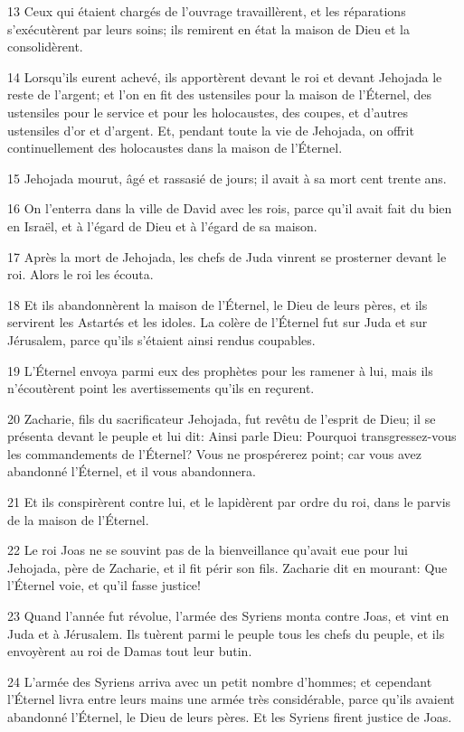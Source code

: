 \par 13 Ceux qui étaient chargés de l'ouvrage travaillèrent, et les réparations s'exécutèrent par leurs soins; ils remirent en état la maison de Dieu et la consolidèrent.
\par 14 Lorsqu'ils eurent achevé, ils apportèrent devant le roi et devant Jehojada le reste de l'argent; et l'on en fit des ustensiles pour la maison de l'Éternel, des ustensiles pour le service et pour les holocaustes, des coupes, et d'autres ustensiles d'or et d'argent. Et, pendant toute la vie de Jehojada, on offrit continuellement des holocaustes dans la maison de l'Éternel.
\par 15 Jehojada mourut, âgé et rassasié de jours; il avait à sa mort cent trente ans.
\par 16 On l'enterra dans la ville de David avec les rois, parce qu'il avait fait du bien en Israël, et à l'égard de Dieu et à l'égard de sa maison.
\par 17 Après la mort de Jehojada, les chefs de Juda vinrent se prosterner devant le roi. Alors le roi les écouta.
\par 18 Et ils abandonnèrent la maison de l'Éternel, le Dieu de leurs pères, et ils servirent les Astartés et les idoles. La colère de l'Éternel fut sur Juda et sur Jérusalem, parce qu'ils s'étaient ainsi rendus coupables.
\par 19 L'Éternel envoya parmi eux des prophètes pour les ramener à lui, mais ils n'écoutèrent point les avertissements qu'ils en reçurent.
\par 20 Zacharie, fils du sacrificateur Jehojada, fut revêtu de l'esprit de Dieu; il se présenta devant le peuple et lui dit: Ainsi parle Dieu: Pourquoi transgressez-vous les commandements de l'Éternel? Vous ne prospérerez point; car vous avez abandonné l'Éternel, et il vous abandonnera.
\par 21 Et ils conspirèrent contre lui, et le lapidèrent par ordre du roi, dans le parvis de la maison de l'Éternel.
\par 22 Le roi Joas ne se souvint pas de la bienveillance qu'avait eue pour lui Jehojada, père de Zacharie, et il fit périr son fils. Zacharie dit en mourant: Que l'Éternel voie, et qu'il fasse justice!
\par 23 Quand l'année fut révolue, l'armée des Syriens monta contre Joas, et vint en Juda et à Jérusalem. Ils tuèrent parmi le peuple tous les chefs du peuple, et ils envoyèrent au roi de Damas tout leur butin.
\par 24 L'armée des Syriens arriva avec un petit nombre d'hommes; et cependant l'Éternel livra entre leurs mains une armée très considérable, parce qu'ils avaient abandonné l'Éternel, le Dieu de leurs pères. Et les Syriens firent justice de Joas.

